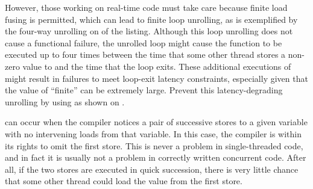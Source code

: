 \begin{description}[labelsep=.4em]
\begin{fcvref}
However, those working on real-time code must take care because finite
load fusing is permitted, which can lead to finite loop unrolling,
as is exemplified by the four-way unrolling on  of
the listing.
Although this loop unrolling does not cause a functional failure, the
unrolled loop might cause the  function to be
executed up to four times between the time that some other thread stores
a non-zero value to  and the time that the loop exits.
These additional executions of  might result
in failures to meet loop-exit latency constraints, especially given that
the value of ``finite'' can be extremely large.
Prevent this latency-degrading unrolling by using 
as shown on .
\end{fcvref}

\QuickQuizEnd

\item[Store fusing] can occur when the compiler notices a pair of successive
stores to a given variable with no intervening loads from that variable.
In this case, the compiler is within its rights to omit the first store.
This is never a problem in single-threaded code, and in fact it is
usually not a problem in correctly written concurrent code.
After all, if the two stores are executed in quick succession, there is
very little chance that some other thread could load the value from the
first store.


\end{description}
